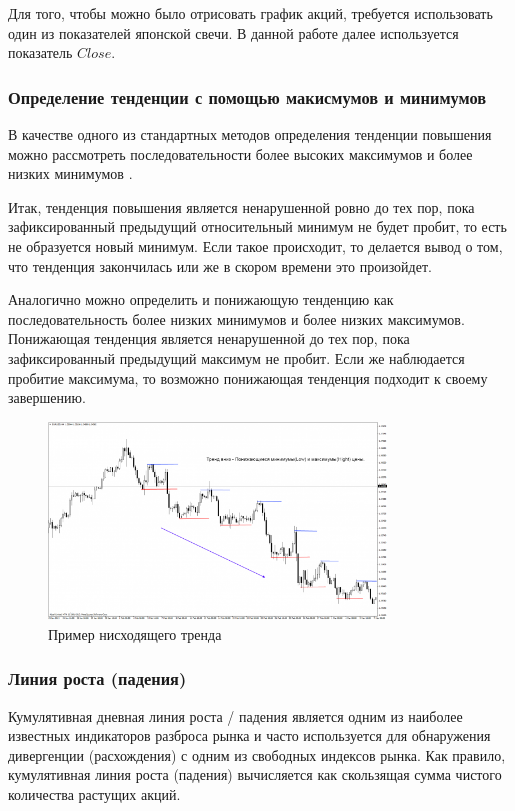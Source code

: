 \documentclass[bachelor, och, coursework]{SCWorks}
\begin{document}
            Для того, чтобы можно было отрисовать график акций, требуется
            использовать один из показателей японской свечи. В данной работе
            далее используется показатель $Close$.

            \subsubsection{Определение тенденции с помощью макисмумов и минимумов}

            В качестве одного из стандартных методов определения тенденции
            повышения можно рассмотреть последовательности более высоких
            максимумов и более низких минимумов \cite{schwager1995technical}.    

            Итак, тенденция повышения является ненарушенной ровно до тех пор,
            пока зафиксированный предыдущий относительный минимум не будет
            пробит, то есть не образуется новый минимум. Если такое происходит,
            то делается вывод о том, что тенденция закончилась или же в скором
            времени это произойдет.

            Аналогично можно определить и понижающую тенденцию как
            последовательность более низких минимумов и более низких максимумов.
            Понижающая тенденция является ненарушенной до тех пор, пока
            зафиксированный предыдущий максимум не пробит. Если же наблюдается
            пробитие максимума, то возможно понижающая тенденция подходит к
            своему завершению.

                \begin{figure}[H]
                    \centering
                    \includegraphics[width=0.8\textwidth]{pic/trand.png}
                    \caption{Пример нисходящего тренда}
                \end{figure}

            \subsubsection{Линия роста (падения)}
            Кумулятивная дневная линия роста / падения является одним из
            наиболее известных индикаторов разброса рынка и часто используется
            для обнаружения дивергенции (расхождения) с одним из свободных
            индексов рынка. Как правило, кумулятивная линия роста (падения)
            вычисляется как скользящая сумма чистого количества растущих акций.
                
\end{document}
